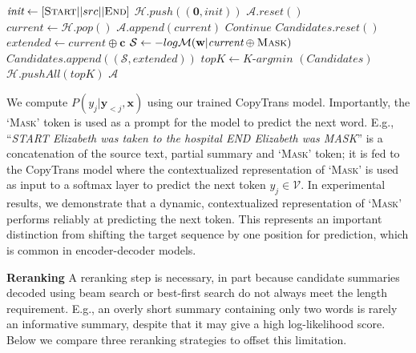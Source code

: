 \documentclass[letterpaper]{article} %
\begin{document}
\begin{algorithm}[t]
\caption{Best-First Search}\label{alg:AStar}
\begin{algorithmic}[1]
\newline
{}
\State $\textit{init} \gets [\textsc{Start} || src|| \textsc{End}]$
\State $\mathcal{H}.push((\mathbf{0}, \textit{init}))$
\State $\mathcal{A}.reset()$
    \State $\textit{current} \gets \mathcal{H}.pop()$
        \State $\mathcal{A}.append(\textit{current})$
        \State $\textit{Continue}$
    \EndIf
    \State $\textit{Candidates}.reset()$
        \State $\textit{extended} \gets \textit{current}\oplus \mathbf{c}$
        \State $\mathcal{S} \gets -log \mathcal{M}(\mathbf{w}|\textit{current}\oplus \textsc{Mask}) $
        \State $\textit{Candidates}.append((\mathcal{S}, \textit{extended}))$
    \EndFor
    \State $\textit{topK} \gets \textit{K-argmin }(\textit{Candidates})$
    \State $\mathcal{H}.pushAll(\textit{topK})$
\EndWhile
\Return $\mathcal{A}$
\EndProcedure
\end{algorithmic}
\end{algorithm} %
We compute $P(y_j|\mathbf{y}_{<j}, \mathbf{x})$ using our trained CopyTrans model.
Importantly, the `\textsc{Mask}' token is used as a prompt for the model to predict the next word.
E.g., ``\emph{START Elizabeth was taken to the hospital END Elizabeth was MASK}'' is a concatenation of the source text, partial summary and `\textsc{Mask}' token; it is fed to the CopyTrans model where the contextualized representation of `\textsc{Mask}' is used as input to a softmax layer to predict the next token $y_j \in \mathcal{V}$.
In experimental results, we demonstrate that a dynamic, contextualized representation of `\textsc{Mask}' performs reliably at predicting the next token. 
This represents an important distinction from shifting the target sequence by one position for prediction, which is common in encoder-decoder models.

\vspace{0.08in}
\noindent\textbf{Reranking}\quad
A reranking step is necessary, in part because candidate summaries decoded using beam search or best-first search do not always meet the length requirement. 
E.g., an overly short summary containing only two words is rarely an informative summary, despite that it may give a high log-likelihood score.
Below we compare three reranking strategies to offset this limitation. 
\end{document}
